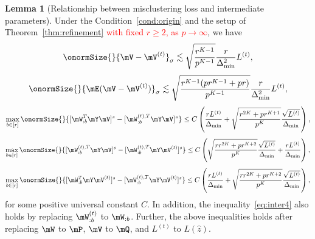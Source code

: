\documentclass[lettersize,onecolumn,journal]{IEEEtran}
\theoremstyle{definition}
\newtheorem{lem}{Lemma}
\theoremstyle{definition}
\newcommand{\of}[1]{\left(#1\right)}
\begin{document}
     \begin{lem}[Relationship between misclustering loss and intermediate parameters]\label{lem:intermediate} Under the Condition~\ref{cond:origin} and the setup of Theorem~\ref{thm:refinement} \textcolor{red}{with fixed $r \geq 2$, as $p \rightarrow \infty$}, we have
    \begin{equation}\label{eq:inter1}
        \onormSize{}{\mV - \mV^{(t)}}_{\sigma} \lesssim \sqrt{\frac{r^{K-1}}{p^{K-1}}}  \frac{r}{\Delta_{\min}^2} L^{(t)},
    \end{equation}
    \begin{equation}\label{eq:inter2}
        \onormSize{}{\mE (\mV - \mV^{(t)})}_{\sigma} \lesssim \sqrt{ \frac{r^{K-1}(p r^{K-1} + p r)}{p^{K-1}}} 
 \frac{r}{\Delta_{\min}^2} L^{(t)},
 \end{equation}
 \begin{equation}\label{eq:inter3}
     \max_{b \in [r]} \onormSize{}{ [ \mW_{:b}^T \mY \mV ]^s   -  [ \mW_{:b}^{(t), T} \mY \mV  ]^s } \leq C \of{\frac{r L^{(t)}}{\Delta_{\min}} + \sqrt{ \frac{r^{2K} + pr^{K+1}}{p^{K}} } \frac{\sqrt{L^{(t)}}}{\Delta_{\min}}},
 \end{equation}
 \begin{equation}\label{eq:inter4}
     \max_{b \in [r]} \onormSize{}{  [  \mW_{:b}^{(t), T}  \mY \mV]^s - [  \mW_{:b}^{(t), T}  \mY \mV^{(t)}]^s } \leq C  \of{ \sqrt{ \frac{rr^{2K} + p r^{K+2}}{p^{K}}}  \frac{\sqrt{L^{(t)}}}{\Delta_{\min}} +  \frac{r L^{(t)}}{\Delta_{\min}}},
     \end{equation}
    \begin{equation}\label{eq:inter5}
         \max_{b \in [r]} \onormSize{}{ [\mW_{:b}^T \mY \mV^{(t)} ]^s   -  [ \mW_{:b}^{(t), T} \mY \mV^{(t)} ]^s } \leq C \of{\frac{rL^{(t)}}{\Delta_{\min}} + \sqrt{ \frac{rr^{2K} + p r^{K+2}}{p^{K}}}  \frac{\sqrt{L^{(t)}}}{\Delta_{\min}}},
    \end{equation}
    for some positive universal constant $C$. In addition, the inequality~\eqref{eq:inter4} also holds by replacing $\mW_{:b}^{(t)}$ to $\mW_{:b}$. Further, the above inequalities holds after replacing $\mW$ to $\mP$, $\mV$ to $\mQ$, and $L^{(t)}$ to $L(\hat z)$.
    \end{lem}
        
\end{document}
